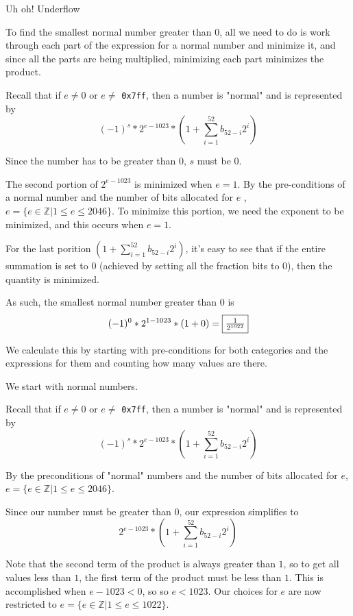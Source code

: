 \documentclass[11pt, nopagenumbers]{adamblan-hw}
\newcommand{\ZZ}{\mathbb{Z}}
\begin{document}
\begin{question}{Uh oh! Underflow}
\pagebreak
\begin{part}
To find the smallest normal number greater than 0, all we need to do is
work through each part of the expression for a normal number and minimize it,
and since all the parts are being multiplied, minimizing each part minimizes
the product.

Recall that if $e \neq 0$ or $e \neq$ \texttt{0x7ff}, then a number is "normal" and
is represented by $$(-1)^s * 2^{e-1023} * (1 + \sum\limits_{i=1}^{52}{b_{52-i}2^i})$$ 

Since the number has to be greater than 0, $s$ must be 0. 

The second portion of $2^{e-1023}$ is minimized when $e = 1$. By the pre-conditions
of a normal number and the number of bits allocated for $e$
, $e = \{e \in \ZZ | 1 \leq e \leq 2046\}$. To minimize this portion, we need the exponent
to be minimized, and this occurs when $e = 1$.

For the last porition $(1 + \sum\limits_{i=1}^{52}{b_{52-i}2^i})$, it's easy to see
that if the entire summation is set to 0 (achieved by setting all the fraction bits to 0),
then the quantity is minimized. 

As such, the smallest normal number greater than 0 is 
$$(-1)^0 * 2^{1-1023} * (1 + 0) = \fbox{$\frac{1}{2^{1022}}$}$$ 
\end{part}

\pagebreak
\begin{part}
We calculate this by starting
with pre-conditions for both categories and the expressions for them and counting
how many values are there.

We start with normal numbers. 

Recall that if $e \neq 0$ or $e \neq$ \texttt{0x7ff}, then a number is "normal" and
is represented by $$(-1)^s * 2^{e-1023} * (1 + \sum\limits_{i=1}^{52}{b_{52-i}2^i})$$ 

By the preconditions of "normal" numbers and the
number of bits allocated for $e$, $e = \{e \in \ZZ | 1 \leq e \leq 2046\}$.

Since our number must be greater than 0, our expression simplifies to 
$$2^{e-1023} * (1 + \sum\limits_{i=1}^{52}{b_{52-i}2^i})$$ 

Note that the second term
of the product is always greater than $1$, so to get all values less than $1$, the first
term of the product must be less than $1$. This is accomplished when $e - 1023 < 0$, so 
so $e < 1023$. Our choices for $e$ are now restricted to $e = \{e \in \ZZ | 1 \leq e \leq 1022\}$.


\end{part}
\end{question}
\end{document}

